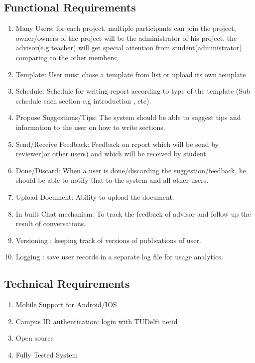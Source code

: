 \subsection{Functional Requirements} %
\label{sub:functional_requirement}
\begin{enumerate}
	\item Many Users: for each project, multiple participants can join the project, owner/owners of the project will be the administrator of his project. the advisor(e.g teacher) will get special attention from student(administrator) comparing to the other members;
	\item Template: User must chose a template from list or upload its own template
	\item Schedule: Schedule for writing report according to type of the template  (Sub schedule each section e.g introduction , etc).
	\item Propose Suggestions/Tips: The system should be able to suggest tips and information to the user on how to write sections.
	\item Send/Receive Feedback: Feedback on report which will be send by reviewer(or other users) and which will be received by student.
	\item Done/Discard: When a user is done/discarding the suggestion/feedback, he should be able to notify that to the system and all other users. 
	\item Upload Document: Ability to upload the document.
	\item In built Chat mechanism: To track the feedback of advisor and follow up the result of conversations. 
	\item Versioning : keeping track of versions of publications of user.
	\item Logging : save user records in a separate log file for usage analytics.
\end{enumerate}

\subsection{Technical Requirements} %
\label{sub:technical_requirements}
\begin{enumerate}
	\item Mobile Support for Android/IOS
	\item Campus ID authentication: login with TUDelft netid
	\item Open source
 	\item Fully Tested System 
	 
\end{enumerate}


